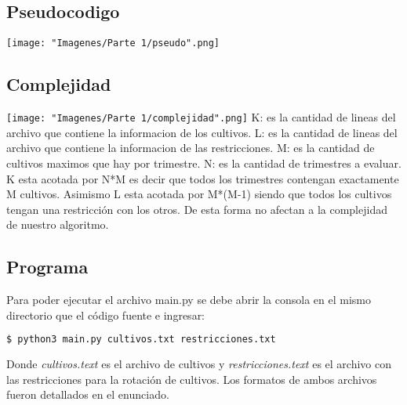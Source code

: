 \subsection{Pseudocodigo}
\texttt{[image: "Imagenes/Parte 1/pseudo".png]}\newline

\subsection{Complejidad}
\texttt{[image: "Imagenes/Parte 1/complejidad".png]}\newline
K: es la cantidad de lineas del archivo que contiene la informacion de los cultivos.\newline
L: es la cantidad de lineas del archivo que contiene la informacion de las restricciones.\newline
M: es la cantidad de cultivos maximos que hay por trimestre.\newline
N: es la cantidad de trimestres a evaluar.\newline
K esta acotada por N*M es decir que todos los trimestres contengan exactamente M cultivos. Asimismo L esta acotada por M*(M-1) siendo que todos los cultivos tengan una restricción con los otros.\newline
De esta forma no afectan a la complejidad de nuestro algoritmo.

\subsection{Programa}
Para poder ejecutar el archivo main.py se debe abrir la consola en el mismo directorio que el código fuente e ingresar:
\begin{lstlisting}[language=bash]
  $ python3 main.py cultivos.txt restricciones.txt
\end{lstlisting}
Donde \emph {cultivos.text} es el archivo de cultivos y \emph{restricciones.text} es el archivo con las restricciones para la rotación de cultivos. Los formatos de ambos archivos fueron detallados en el enunciado. \newline
